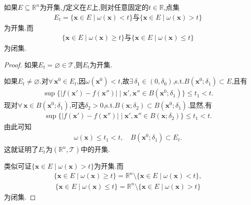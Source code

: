 \documentclass[../../main.tex]{subfiles}%
\begin{document}
\begin{theorem}\label{theorem:振幅函数的定义和性质}
如果$E\subseteq\mathbb{R}^n$为开集,$f$定义在$E$上,则对任意固定的$t\in\mathbb{R}$,点集
\begin{align*}
E_t=\{\boldsymbol{x}\in E\mid \omega(\boldsymbol{x})<t\}\text{与}\{\boldsymbol{x}\in E\mid \omega(\boldsymbol{x})>t\}
\end{align*}
为开集.而
\begin{align*}
\{\boldsymbol{x}\in E\mid \omega(\boldsymbol{x})\geqslant t\}\text{与}\{\boldsymbol{x}\in E\mid \omega(\boldsymbol{x})\leqslant t\}
\end{align*}
为闭集.
\end{theorem}
\begin{proof}

如果$E_t=\varnothing\in\mathscr{T}$,则$E_t$为开集.

如果$E_t\neq\varnothing$.对$\forall\,\boldsymbol{x}^0\in E_t$,因$\omega(\boldsymbol{x}^0)<t$,故$\exists\,\delta_1\in(0,\delta_0)$,s.t.$B(\boldsymbol{x}^0;\delta_1)\subset E$,且有
\begin{align*}
\sup\{|f(\boldsymbol{x}')-f(\boldsymbol{x}'')|\mid \boldsymbol{x}',\boldsymbol{x}''\in B(\boldsymbol{x}^0;\delta_1)\}\leqslant t_1<t.
\end{align*}
现对$\forall\,\boldsymbol{x}\in B(\boldsymbol{x}^0;\delta_1)$,可选$\delta_2>0$,s.t.$B(\boldsymbol{x};\delta_2)\subset B(\boldsymbol{x}^0;\delta_1)$.显然,有
\begin{align*}
\sup\{|f(\boldsymbol{x}')-f(\boldsymbol{x}'')|\mid \boldsymbol{x}',\boldsymbol{x}''\in B(\boldsymbol{x};\delta_2)\}\leqslant t_1<t.
\end{align*}
由此可知
\begin{align*}
\omega(\boldsymbol{x})\leqslant t_1<t,\quad B(\boldsymbol{x}^0;\delta_1)\subset E_t.
\end{align*}
这就证明了$E_t$为$(\mathbb{R}^n,\mathscr{T})$中的开集.

类似可证$\{\boldsymbol{x}\in E\mid \omega(\boldsymbol{x})>t\}$为开集.而
\begin{align*}
\{\boldsymbol{x}\in E\mid \omega(\boldsymbol{x})\geqslant t\}=\mathbb{R}^n\setminus\{\boldsymbol{x}\in E\mid \omega(\boldsymbol{x})<t\},
\end{align*}
\begin{align*}
\{\boldsymbol{x}\in E\mid \omega(\boldsymbol{x})\leqslant t\}=\mathbb{R}^n\setminus\{\boldsymbol{x}\in E\mid \omega(\boldsymbol{x})>t\}
\end{align*}
为闭集.

\end{proof}
\end{document}
